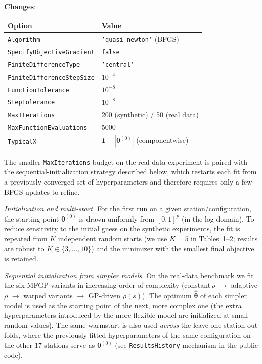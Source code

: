 \documentclass[12pt]{article}
\newcommand{\bs}{\boldsymbol}
\newcommand{\0}{\mathbf{0}}
\newcounter{reviewer}
\newcounter{point}[reviewer]
\newenvironment{changes}
   {\medskip \noindent \begin{sf}\color{ForestGreen}\textbf{Changes}:\  }
   {\medskip \end{sf}}
\begin{document}
\begin{changes}
\begin{center}
\small
\begin{tabular}{ll}
\toprule
Option & Value \\
\midrule
\texttt{Algorithm}                   & \texttt{'quasi-newton'} (BFGS) \\
\texttt{SpecifyObjectiveGradient}    & \texttt{false} \\
\texttt{FiniteDifferenceType}        & \texttt{'central'} \\
\texttt{FiniteDifferenceStepSize}    & $10^{-4}$ \\
\texttt{FunctionTolerance}           & $10^{-8}$ \\
\texttt{StepTolerance}               & $10^{-8}$ \\
\texttt{MaxIterations}               & 200 (synthetic) / 50 (real data) \\
\texttt{MaxFunctionEvaluations}      & 5000 \\
\texttt{TypicalX}                    & $\mathbf{1}+|\bs{\theta}^{(0)}|$ (componentwise) \\
\bottomrule
\end{tabular}
\end{center}

The smaller \texttt{MaxIterations} budget on the real-data experiment is paired with the sequential-initialization strategy described below, which restarts each fit from a previously converged set of hyperparameters and therefore requires only a few BFGS updates to refine.

\smallskip
\noindent\textit{Initialization and multi-start.} For the first run on a given station/configuration, the starting point $\bs{\theta}^{(0)}$ is drawn uniformly from $[0,1]^{p}$ (in the log-domain). To reduce sensitivity to the initial guess on the synthetic experiments, the fit is repeated from $K$ independent random starts (we use $K=5$ in Tables~1--2; results are robust to $K\in\{3,\dots,10\}$) and the minimizer with the smallest final objective is retained.

\smallskip
\noindent\textit{Sequential initialization from simpler models.} On the real-data benchmark we fit the six MFGP variants in increasing order of complexity (constant\,$\rho$ $\rightarrow$ adaptive\,$\rho$ $\rightarrow$ warped variants $\rightarrow$ GP-driven $\rho(s)$). The optimum $\hat{\bs{\theta}}$ of each simpler model is used as the starting point of the next, more complex one (the extra hyperparameters introduced by the more flexible model are initialized at small random values). The same warmstart is also used \emph{across} the leave-one-station-out folds, where the previously fitted hyperparameters of the same configuration on the other 17 stations serve as $\bs{\theta}^{(0)}$ (see \texttt{ResultsHistory} mechanism in the public code).


\end{changes}
\end{document}
